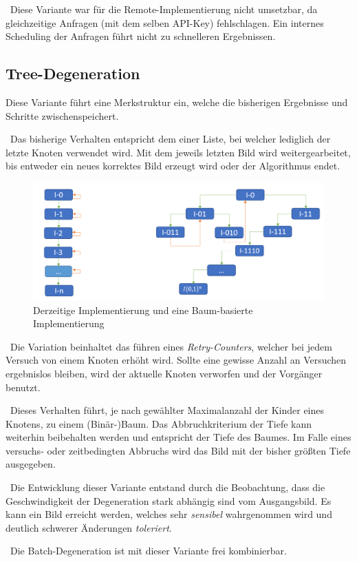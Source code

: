 ~\newline Diese Variante war für die Remote-Implementierung nicht umsetzbar, da gleichzeitige Anfragen (mit dem selben API-Key) fehlschlagen. Ein internes Scheduling der Anfragen führt nicht zu schnelleren Ergebnissen. 
\subsection{Tree-Degeneration}
Diese Variante führt eine Merkstruktur ein, welche die bisherigen Ergebnisse und Schritte zwischenspeichert. 

~\newline Das bisherige Verhalten entspricht dem einer Liste, bei welcher lediglich der letzte Knoten verwendet wird. Mit dem jeweils letzten Bild wird weitergearbeitet, bis entweder ein neues korrektes Bild erzeugt wird oder der Algorithmus endet. 
\begin{figure}[h]
	\centering
	\includegraphics[width=0.8\linewidth]{Images/DegenTreeNormal}
	\caption[Tree-Degeneration]{Derzeitige Implementierung und eine Baum-basierte Implementierung}
	\label{fig:degentreenormal}
\end{figure}


~\newline Die Variation beinhaltet das führen eines \textit{Retry-Counters}, welcher bei jedem Versuch von einem Knoten erhöht wird. Sollte eine gewisse Anzahl an Versuchen ergebnislos bleiben, wird der aktuelle Knoten verworfen und der Vorgänger benutzt. 

~\newline Dieses Verhalten führt, je nach gewählter Maximalanzahl der Kinder eines Knotens, zu einem (Binär-)Baum. Das Abbruchkriterium der Tiefe kann weiterhin beibehalten werden und entspricht der Tiefe des Baumes. Im Falle eines versuchs- oder zeitbedingten Abbruchs wird das Bild mit der bisher größten Tiefe ausgegeben.

~\newline Die Entwicklung dieser Variante entstand durch die Beobachtung, dass die Geschwindigkeit der Degeneration stark abhängig sind vom Ausgangsbild. Es kann ein Bild erreicht werden, welches sehr \textit{sensibel} wahrgenommen wird und deutlich schwerer Änderungen \textit{toleriert}.

~\newline Die Batch-Degeneration ist mit dieser Variante frei kombinierbar.  